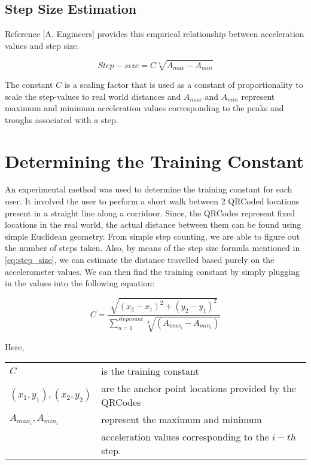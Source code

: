 \subsection{Step Size Estimation}

Reference [A. Engineers] provides this empirical relationship between acceleration
values and step size.

\begin{equation}\label{eq:step_size}
 Step-size = C \sqrt[4]{A_{max} - A_{min}}
\end{equation}

The constant $C$ is a scaling factor that is used as a constant of proportionality
to scale the step-values to real world distances and $A_{max}$ and $A_{min}$
represent maximum and minimum acceleration values corresponding to the 
peaks and troughs associated with a step.


\section{Determining the Training Constant}

An experimental method was used to determine the training constant for each
user. It involved the user to perform a short walk between 2 QRCoded locations
present in a straight line along a corridoor.
Since, the QRCodes represent fixed locations in the real world, the actual 
distance between them can be found using simple Euclidean geometry. From 
simple step counting, we are able to figure out the number of steps taken.
Also, by means of the step size formula mentioned in \eqref{eq:step_size},
we can estimate the distance travelled based purely on the accelerometer
values. We can then find the training constant by simply plugging in 
the values into the following equation:

\begin{equation}
C=\frac{\sqrt{(x_{2}-x_{1})^{2}+(y_{2}-y_{1})^{2}}}{\sum_{n=1}^{stepcount}\sqrt[4]{(A_{max_{i}}-A_{min_{i}})}}
\end{equation}

Here,\\
\begin{tabular}{l l}
$C$                         & is the training constant   \\
$(x_1, y_1), (x_2, y_2)$    & are the anchor point locations provided by the QRCodes \\
$A_{max_{i}}, A_{min_{i}}$  & represent the maximum and minimum \\
                            & acceleration values corresponding to the $i-th$ step.\\
\end{tabular}


